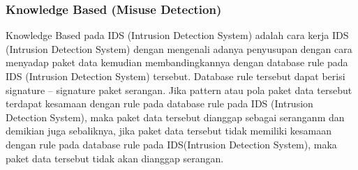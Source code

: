\documentclass[conference]{IEEEtran}
\begin{document}
\subsubsection{Knowledge Based (Misuse Detection)}
Knowledge Based pada IDS (Intrusion Detection System) adalah cara kerja IDS (Intrusion Detection System) dengan mengenali adanya penyusupan dengan cara menyadap paket data kemudian membandingkannya dengan database rule pada IDS (Intrusion Detection System) tersebut. Database rule tersebut dapat berisi signature – signature paket serangan. Jika pattern atau pola paket data tersebut terdapat kesamaan dengan rule pada database rule pada IDS (Intrusion Detection System), maka paket data tersebut dianggap sebagai seranganm dan demikian juga sebaliknya, jika paket data tersebut tidak memiliki kesamaan dengan rule pada database rule pada IDS(Intrusion Detection System), maka paket data tersebut tidak akan dianggap serangan.
\end{document}
